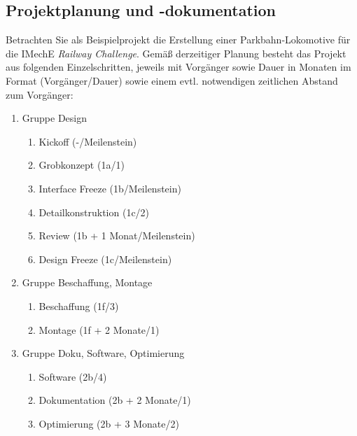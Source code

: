 \documentclass[11pt,a4paper,addpoints]{exam}
\begin{document}
\begin{questions}
\section{Projektplanung und -dokumentation}
Betrachten Sie als Beispielprojekt die Erstellung einer Parkbahn-Lokomotive f\"ur die IMechE \textit{Railway Challenge}. Gem\"a{\ss} derzeitiger Planung besteht das Projekt aus folgenden Einzelschritten, jeweils mit Vorg\"anger sowie Dauer in Monaten im Format (Vorg\"anger/Dauer) sowie einem evtl. notwendigen zeitlichen Abstand zum Vorg\"anger:
	\begin{enumerate}
		\item Gruppe Design
		\begin{enumerate}
		\item Kickoff (-/Meilenstein)
		\item Grobkonzept (1a/1)
		\item Interface Freeze (1b/Meilenstein)
		\item Detailkonstruktion (1c/2)
		\item Review (1b + 1 Monat/Meilenstein)
		\item Design Freeze (1c/Meilenstein)
		\end{enumerate}
		\item Gruppe Beschaffung, Montage
		\begin{enumerate}
		\item Beschaffung (1f/3)
		\item Montage (1f + 2 Monate/1)
		\end{enumerate}
		\item Gruppe Doku, Software, Optimierung
		\begin{enumerate}
		\item Software (2b/4)
		\item Dokumentation (2b + 2 Monate/1)
		\item Optimierung (2b + 3 Monate/2)
		\end{enumerate}
	\end{enumerate}

\question
\begin{parts}

\end{parts}
\end{questions}
\end{document}
